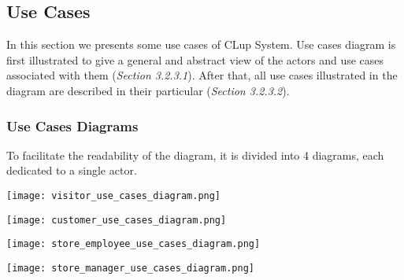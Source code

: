 \subsection{Use Cases}

    In this section we presents some use cases of CLup System. Use cases diagram is first illustrated to give a general and abstract view of the actors and use cases associated with them (\textit{Section 3.2.3.1}). After that, all use cases illustrated in the diagram are described in their particular (\textit{Section 3.2.3.2}).
    \subsubsection{Use Cases Diagrams}
    To facilitate the readability of the diagram, it is divided into 4 diagrams, each dedicated to a single actor.
        \begin{center}

            \texttt{[image: visitor\_use\_cases\_diagram.png]}

            \texttt{[image: customer\_use\_cases\_diagram.png]}

            \texttt{[image: store\_employee\_use\_cases\_diagram.png]}

            \texttt{[image: store\_manager\_use\_cases\_diagram.png]}
            
        \end{center}

